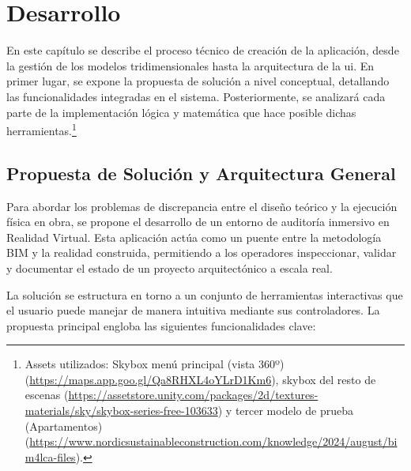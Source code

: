 \chapter{\label{desarrollo}Desarrollo}

En este capítulo se describe el proceso técnico de creación de la aplicación, desde la gestión de los modelos tridimensionales hasta la arquitectura de la \gls{ui}. En primer lugar, se expone la propuesta de solución a nivel conceptual, detallando las funcionalidades integradas en el sistema. Posteriormente, se analizará cada parte de la implementación lógica y matemática que hace posible dichas herramientas.\footnote{Assets utilizados: Skybox menú principal (vista 360º) (\url{https://maps.app.goo.gl/Qa8RHXL4oYLrD1Km6}), skybox del resto de escenas (\url{https://assetstore.unity.com/packages/2d/textures-materials/sky/skybox-series-free-103633}) y tercer modelo de prueba (Apartamentos) (\url{https://www.nordicsustainableconstruction.com/knowledge/2024/august/bim4lca-files}).}

\section{Propuesta de Solución y Arquitectura General}

Para abordar los problemas de discrepancia entre el diseño teórico y la ejecución física en obra, se propone el desarrollo de un entorno de auditoría inmersivo en Realidad Virtual. Esta aplicación actúa como un puente entre la metodología BIM y la realidad construida, permitiendo a los operadores inspeccionar, validar y documentar el estado de un proyecto arquitectónico a escala real.

La solución se estructura en torno a un conjunto de herramientas interactivas que el usuario puede manejar de manera intuitiva mediante sus controladores. La propuesta principal engloba las siguientes funcionalidades clave:


